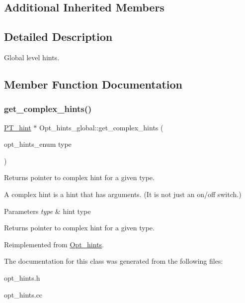 \subsection*{Additional Inherited Members}


\subsection{Detailed Description}
Global level hints. 

\subsection{Member Function Documentation}
\mbox{\label{classOpt__hints__global_a7750a4f66503e4b91a924ad269f52fd9}} 
\subsubsection{\texorpdfstring{get\+\_\+complex\+\_\+hints()}{get\_complex\_hints()}}
{\footnotesize\ttfamily \mbox{\hyperlink{classPT__hint}{P\+T\+\_\+hint}} $\ast$ Opt\+\_\+hints\+\_\+global\+::get\+\_\+complex\+\_\+hints (\begin{DoxyParamCaption}\item[{opt\+\_\+hints\+\_\+enum}]{type }\end{DoxyParamCaption})\hspace{0.3cm}{\ttfamily [virtual]}}

Returns pointer to complex hint for a given type.

A complex hint is a hint that has arguments. (It is not just an on/off switch.)


\begin{DoxyParams}{Parameters}
{\em type} & hint type\\
\hline
\end{DoxyParams}
\begin{DoxyReturn}{Returns}
pointer to complex hint for a given type. 
\end{DoxyReturn}


Reimplemented from \mbox{\hyperlink{classOpt__hints_a3dd8eb290a7b81d9a6d849de18a61cba}{Opt\+\_\+hints}}.



The documentation for this class was generated from the following files\+:\begin{DoxyCompactItemize}
\item 
opt\+\_\+hints.\+h\item 
opt\+\_\+hints.\+cc\end{DoxyCompactItemize}
